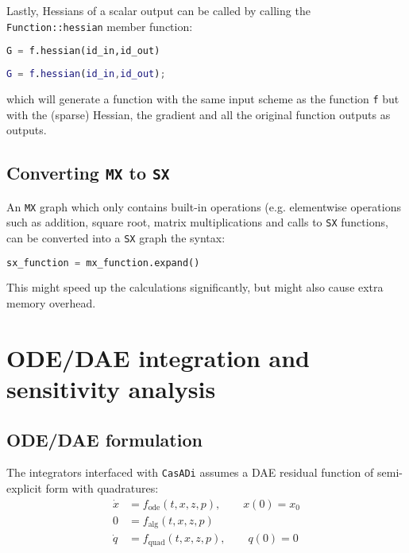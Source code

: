 \documentclass[a4paper,12pt]{book}
\newcommand{\CasADi}{\texttt{CasADi}\xspace}
\begin{document}
Lastly, Hessians of a scalar output can be called by calling the \texttt{Function::hessian} member function:

\begin{minipage}[t]{0.5\textwidth}
\begin{lstlisting}[language=Python]
G = f.hessian(id_in,id_out)
\end{lstlisting}
\end{minipage}
\begin{minipage}[t]{0.5\textwidth}
\begin{lstlisting}[language=Matlab]
G = f.hessian(id_in,id_out);
\end{lstlisting}
\end{minipage}

which will generate a function with the same input scheme as the function \texttt{f} but with the (sparse) Hessian, the gradient and all the original function outputs as outputs.

\section{Converting \texttt{MX} to \texttt{SX}}
An \texttt{MX} graph which only contains built-in operations (e.g. elementwise operations such as addition, square root, matrix multiplications and calls to \texttt{SX} functions, can be converted into a \texttt{SX} graph the syntax:

\begin{lstlisting}[language=Python]
sx_function = mx_function.expand()
\end{lstlisting}

This might speed up the calculations significantly, but might also cause extra memory overhead.

\chapter{ODE/DAE integration and sensitivity analysis} \label{ch:integrators}
\section{ODE/DAE formulation}
The integrators interfaced with \CasADi assumes a DAE residual function of semi-explicit form with quadratures:
\begin{subequations}
\begin{align}
 \dot{x} &= f_{\text{ode}}(t,x,z,p), \qquad x(0) = x_0 \\
      0  &= f_{\text{alg}}(t,x,z,p) \\
 \dot{q} &= f_{\text{quad}}(t,x,z,p), \qquad q(0) = 0
\end{align}
\end{subequations}
\end{document}
